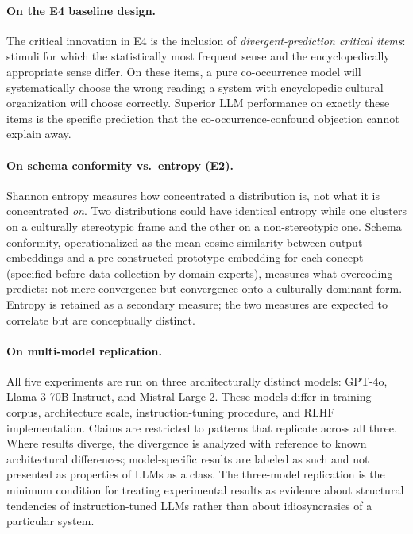 \documentclass[12pt,a4paper]{article}
\begin{document}
\paragraph{On the E4 baseline design.} The critical innovation in E4 is the
inclusion of \emph{divergent-prediction critical items}: stimuli for which the
statistically most frequent sense and the encyclopedically appropriate sense
differ. On these items, a pure co-occurrence model will systematically choose
the wrong reading; a system with encyclopedic cultural organization will choose
correctly. Superior LLM performance on exactly these items is the specific
prediction that the co-occurrence-confound objection cannot explain away.

\paragraph{On schema conformity vs.\ entropy (E2).} Shannon entropy measures
how concentrated a distribution is, not what it is concentrated \emph{on}.
Two distributions could have identical entropy while one clusters on a
culturally stereotypic frame and the other on a non-stereotypic one. Schema
conformity, operationalized as the mean cosine similarity between output
embeddings and a pre-constructed prototype embedding for each concept
(specified before data collection by domain experts), measures what overcoding
predicts: not mere convergence but convergence onto a culturally dominant form.
Entropy is retained as a secondary measure; the two measures are expected to
correlate but are conceptually distinct.

\paragraph{On multi-model replication.} All five experiments are run on three
architecturally distinct models: GPT-4o, Llama-3-70B-Instruct, and
Mistral-Large-2. These models differ in training corpus, architecture scale,
instruction-tuning procedure, and RLHF implementation. Claims are restricted
to patterns that replicate across all three. Where results diverge, the
divergence is analyzed with reference to known architectural differences;
model-specific results are labeled as such and not presented as properties of
LLMs as a class. The three-model replication is the minimum condition for
treating experimental results as evidence about structural tendencies of
instruction-tuned LLMs rather than about idiosyncrasies of a particular
system.
\end{document}
